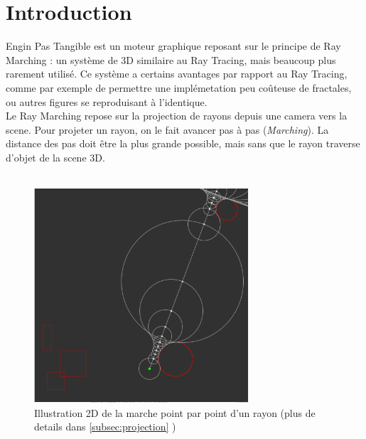 \section{Introduction}

    Engin Pas Tangible est un moteur graphique reposant sur le principe de Ray Marching : un système de 3D similaire au Ray Tracing, mais beaucoup plus rarement utilisé. Ce système a certains avantages par rapport au Ray Tracing, comme par exemple de permettre une implémetation peu coûteuse de fractales, ou autres figures se reproduisant à l'identique. \\
    Le Ray Marching repose sur la projection de rayons depuis une camera vers la scene. Pour projeter un rayon, on le fait avancer pas à pas (\emph{Marching}). La distance des pas doit être la plus grande possible, mais sans que le rayon traverse d'objet de la scene 3D.
\\
\\
\begin{figure}[h]
    \centering
    \includegraphics[width=8cm]{images/marching.png}
    \caption{Illustration 2D de la marche point par point d'un rayon (plus de details dans \ref{subsec:projection} )}
    \label{fig:my_label}
\end{figure}
